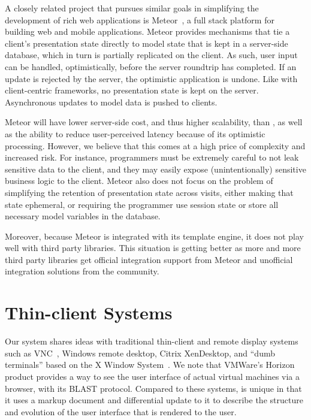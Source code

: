 A closely related project that pursues similar goals in simplifying the development
of rich web applications is Meteor~\cite{meteor}, a full stack platform for building 
web and mobile applications.  Meteor provides mechanisms that tie a client's presentation
state directly to model state that is kept in a server-side database, which in turn is 
partially replicated on the client.  As such, user input can be handled, optimistically, before 
the server roundtrip has completed. If an update is rejected by the server, the optimistic 
application is undone. Like with client-centric frameworks, no presentation state is kept on
the server. Asynchronous updates to model data is pushed to clients.

Meteor will have lower server-side cost, and thus higher scalability, than \cb, as well
as the ability to reduce user-perceived latency because of its optimistic processing.
However, we believe that this comes at a high price of complexity and increased risk.
For instance, programmers must be extremely careful to not leak sensitive data to the 
client, and they may easily expose (unintentionally) sensitive business logic to the client.  
Meteor also does not focus on the problem of simplifying the retention of presentation
state across visits, either making that state ephemeral, or requiring the programmer
use session state or store all necessary model variables in the database.

Moreover, because Meteor is integrated with its template engine, it does not play well
with third party \js libraries. This situation is getting better as more and more third
party libraries get official integration support from Meteor and unofficial integration
solutions from the community.


\section{Thin-client Systems}

Our system shares ideas with traditional thin-client and remote display 
systems such as VNC~\cite{richardson1998virtual}, Windows remote desktop, 
Citrix XenDesktop, and 
``dumb terminals'' based on the X Window  System~\cite{ScheiflerGettys:acmtg1986}.  
We note that VMWare's Horizon product provides
a way to see the user interface of actual virtual machines via a browser, with its
BLAST protocol.  Compared to these systems, \cb{} is 
unique in that it uses a markup document and differential update to it to 
describe the structure and evolution of the user interface that is rendered 
to the user.  

